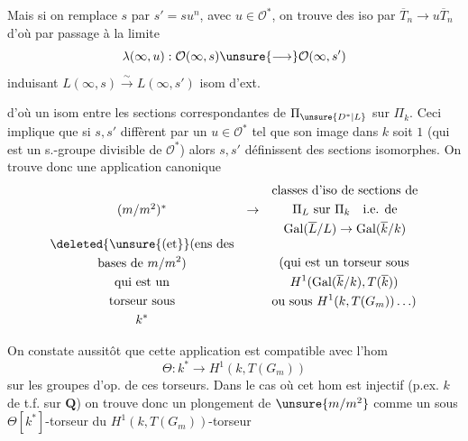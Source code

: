 Mais si on remplace $s$ par $s'=su^n$, avec $u\in\mathcal{O}^*$, on trouve des iso
par $\overline{T}_n\to u\overline{T}_n$
d'où par passage à la limite
\[
\lambda(\infty,u):\mathcal{O}(\infty,s)\unsure{\longrightarrow}\mathcal{O}(\infty,s')
\]
induisant $L(\infty,s)\xrightarrow{\sim}L(\infty,s')$ isom d'ext.



d'où un isom entre les sections correspondantes de $\Pi_{\unsure{D^*|L}}$ sur $\Pi_k$.
Ceci implique que si $s,s'$ diffèrent par un $u\in\mathcal{O}^*$ tel que son image dans $k$ soit $1$   (qui est un s.-groupe divisible de $\mathcal{O}^*$\unsure{]|)}) alors $s,s'$ définissent des sections isomorphes.
On trouve donc une application canonique
\[
\begin{array}{ccl}
(m/m^2)^* & \to &
\begin{gathered}
\text{classes d'iso de sections de}\\
\Pi_L\text{ sur }\Pi_k\quad\text{i.e. de}\\
\operatorname{Gal}(\overline{L}/L)\to\operatorname{Gal}(\overline{k}/k)
\end{gathered}
\\[1ex]
\begin{gathered}
\deleted{\unsure{\text{(et}}}\text{(ens des}\\
\text{bases de }m/m^2\text{)}\\
\text{qui est un}\\
\text{torseur sous}\\ k^*
\end{gathered}
&&
\begin{gathered}
\text{(qui est un torseur sous}\\
H^1(\operatorname{Gal}(\overline{k}/k),T(\overline{k}))\\
\text{ou sous }H^1(k,T(G_m))\ldots)
\end{gathered}
\end{array}
\]

On constate aussitôt que cette application est compatible avec l'hom
\[
\Theta:k^*\to H^1(k,T(G_m))
\]
sur les groupes d'op. de ces torseurs.
Dans le cas où cet hom est injectif (p.ex. $k$  de t.f. sur $\mathbf{Q}$) on trouve donc un plongement de $\unsure{m/m^2}$ comme un sous $\Theta[k^*]$-torseur du $H^1(k,T(G_m))$-torseur

